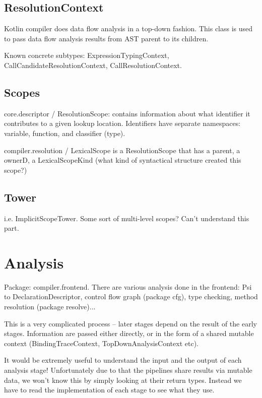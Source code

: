 \documentclass{article}
\begin{document}
\subsection{ResolutionContext}

Kotlin compiler does data flow analysis in a top-down fashion. This class is used to pass data flow analysis results from AST parent to its children.

Known concrete subtypes: ExpressionTypingContext, CallCandidateResolutionContext, CallResolutionContext.

\subsection{Scopes}

core.descriptor / ResolutionScope: contains information about what identifier it contributes to a given lookup location. Identifiers have separate namespaces: variable, function, and classifier (type).

compiler.resolution / LexicalScope is a ResolutionScope that has a parent, a ownerD, a LexicalScopeKind (what kind of syntactical structure created this scope?)

\subsection{Tower}

i.e. ImplicitScopeTower. Some sort of multi-level scopes? Can't understand this part.

\section{Analysis}

Package: compiler.frontend. There are various analysis done in the frontend: Psi to DeclarationDescriptor, control flow graph (package cfg), type checking, method resolution (package resolve)...

This is a very complicated process -- later stages depend on the result of the early stages. Information are passed either directly, or in the form of a shared mutable context (BindingTraceContext, TopDownAnalysisContext etc).

It would be extremely useful to understand the input and the output of each analysis stage! Unfortunately due to that the pipelines share results via mutable data, we won't know this by simply looking at their return types. Instead we have to read the implementation of each stage to see what they use.
\end{document}
